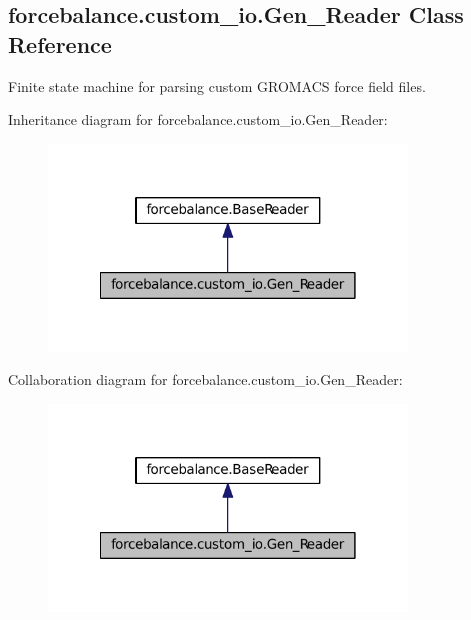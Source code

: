 \hypertarget{classforcebalance_1_1custom__io_1_1Gen__Reader}{\subsection{forcebalance.\-custom\-\_\-io.\-Gen\-\_\-\-Reader \-Class \-Reference}
\label{classforcebalance_1_1custom__io_1_1Gen__Reader}
}


\-Finite state machine for parsing custom \-G\-R\-O\-M\-A\-C\-S force field files.  




\-Inheritance diagram for forcebalance.\-custom\-\_\-io.\-Gen\-\_\-\-Reader\-:
\nopagebreak
\begin{figure}[H]
\begin{center}
\leavevmode
\includegraphics[width=270pt]{classforcebalance_1_1custom__io_1_1Gen__Reader__inherit__graph}
\end{center}
\end{figure}


\-Collaboration diagram for forcebalance.\-custom\-\_\-io.\-Gen\-\_\-\-Reader\-:
\nopagebreak
\begin{figure}[H]
\begin{center}
\leavevmode
\includegraphics[width=270pt]{classforcebalance_1_1custom__io_1_1Gen__Reader__coll__graph}
\end{center}
\end{figure}
